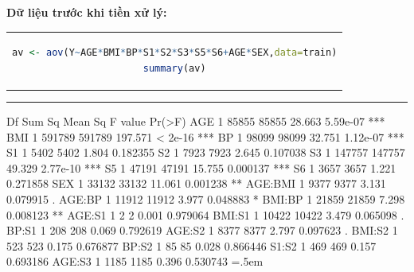 \documentclass[runningheads]{llncs}
\newenvironment{lcverbatim}
 {\SaveVerbatim{cverb}}
 {\endSaveVerbatim
  \flushleft\fboxrule=0pt\fboxsep=.5em
  \colorbox{cverbbg}{%
    \makebox[\dimexpr\linewidth-2\fboxsep][l]{\BUseVerbatim{cverb}}%
  }
  \endflushleft
}
\begin{document}
\textbf{Dữ liệu trước khi tiền xử lý:}
\begin{center}
\begin{tabular}{c}
\begin{lstlisting}[language=R]
av <- aov(Y~AGE*BMI*BP*S1*S2*S3*S5*S6+AGE*SEX,data=train)
summary(av)
\end{lstlisting}
\end{tabular}
\end{center}
\hrule
\begin{lcverbatim}
                       Df Sum Sq Mean Sq F value   Pr(>F)    
AGE                     1  85855   85855  28.663 5.59e-07 ***
BMI                     1 591789  591789 197.571  < 2e-16 ***
BP                      1  98099   98099  32.751 1.12e-07 ***
S1                      1   5402    5402   1.804 0.182355    
S2                      1   7923    7923   2.645 0.107038    
S3                      1 147757  147757  49.329 2.77e-10 ***
S5                      1  47191   47191  15.755 0.000137 ***
S6                      1   3657    3657   1.221 0.271858    
SEX                     1  33132   33132  11.061 0.001238 ** 
AGE:BMI                 1   9377    9377   3.131 0.079915 .  
AGE:BP                  1  11912   11912   3.977 0.048883 *  
BMI:BP                  1  21859   21859   7.298 0.008123 ** 
AGE:S1                  1      2       2   0.001 0.979064    
BMI:S1                  1  10422   10422   3.479 0.065098 .  
BP:S1                   1    208     208   0.069 0.792619    
AGE:S2                  1   8377    8377   2.797 0.097623 .  
BMI:S2                  1    523     523   0.175 0.676877    
BP:S2                   1     85      85   0.028 0.866446    
S1:S2                   1    469     469   0.157 0.693186    
AGE:S3                  1   1185    1185   0.396 0.530743    
\end{lcverbatim}
\end{document}
